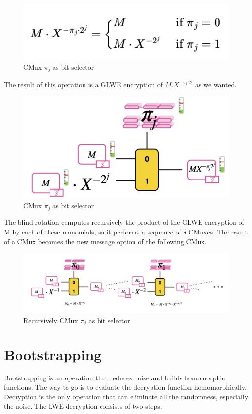 \documentclass{techrep}
\theoremstyle{definition}
\theoremstyle{plain}
\begin{document}
	\begin{figure}[H]
		\centering
	\includegraphics[width=0.6\columnwidth]{fig/cmux_3.png}
		\caption{CMux $\pi_j$ as bit selector}
		\label{fig:cmux_3}
	\end{figure}

The result of this operation is a GLWE encryption of $M.X^{-\pi_j.2^j}$ as we wanted.

	\begin{figure}[H]
		\centering
	\includegraphics[width=0.6\columnwidth]{fig/cmux_4.png}
		\caption{CMux $\pi_j$ as bit selector}
		\label{fig:cmux_4}
	\end{figure}

The blind rotation computes recursively the product of the GLWE encryption of M by each of these monomials, so it performs a sequence of $\delta$ CMuxes. The result of a CMux becomes the new message option of the following CMux.


	\begin{figure}[H]
		\centering
	\includegraphics[width=0.8\columnwidth]{fig/cmux_5.png}
		\caption{Recursively CMux $\pi_j$ as bit selector}
		\label{fig:cmux_5}
	\end{figure}

\section{Bootstrapping}
Bootstrapping is an operation that reduces noise and builds homomorphic functions.
The way to go is to evaluate the decryption function homomorphically. Decryption is the only operation that can eliminate all the randomness, especially the noise.  The LWE decryption consists of two steps:
\end{document}
